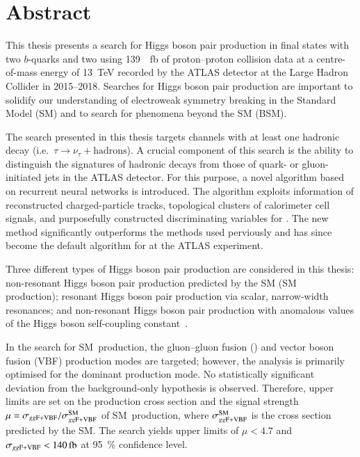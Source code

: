 \chapter*{Abstract}


This thesis presents a search for Higgs boson pair production in final states
with two $b$-quarks and two \tauleptons using \SI{139}{\per\femto\barn} of
proton--proton collision data at a centre-of-mass energy of \SI{13}{\TeV}
recorded by the ATLAS detector at the Large Hadron Collider in 2015--2018.
Searches for Higgs boson pair production are important to solidify our
understanding of electroweak symmetry breaking in the Standard Model (SM) and to
search for phenomena beyond the SM (BSM).

The search presented in this thesis targets channels with at least one hadronic
\taulepton decay (i.e.~$\tau \to \nu_{\tau} + \text{hadrons}$). A crucial
component of this search is the ability to distinguish the signatures of
hadronic \taulepton decays from those of quark- or gluon-initiated jets in the
ATLAS detector. For this purpose, a novel \tauid algorithm based on recurrent
neural networks is introduced. The algorithm exploits information of
reconstructed charged-particle tracks, topological clusters of calorimeter cell
signals, and purposefully constructed discriminating variables for \tauid. The
new \tauid method significantly outperforms the methods used perviously and has
since become the default algorithm for \tauid at the ATLAS experiment.

Three different types of Higgs boson pair production are considered in this
thesis: non-resonant Higgs boson pair production predicted by the SM (SM~\HH
production); resonant Higgs boson pair production via scalar, narrow-width
resonances; and non-resonant Higgs boson pair production with anomalous values
of the Higgs boson self-coupling constant~\lambdahhh.

In the search for SM~\HH production, the gluon--gluon fusion (\ggF) and vector
boson fusion (VBF) production modes are targeted; however, the analysis is
primarily optimised for the dominant \ggF production mode. No statistically
significant deviation from the background-only hypothesis is
observed. Therefore, upper limits are set on the production cross section
\xsecggfvbf and the signal
strength~$\mu = \sigma_{gg\text{F+VBF}} / \sigma_{gg\text{F+VBF}}^{\text{SM}}$ of SM~\HH production,
where $\sigma_{gg\text{F+VBF}}^{\text{SM}}$ is the cross section predicted by the SM. The
search yields upper limits of $\mu < \num{4.7}$ and
$\xsecggfvbf < \SI{140}{\femto\barn}$ at \SI{95}{\percent} confidence level.




